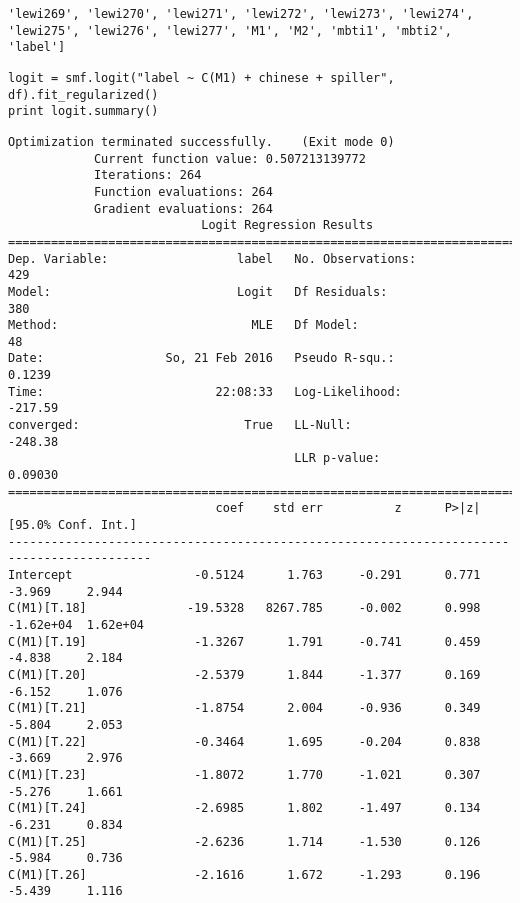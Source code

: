\documentclass[12pt,fleqn]{article}\usepackage{../common}
\begin{document}
\begin{verbatim}
'lewi269', 'lewi270', 'lewi271', 'lewi272', 'lewi273', 'lewi274', 'lewi275', 'lewi276', 'lewi277', 'M1', 'M2', 'mbti1', 'mbti2', 'label']
\end{verbatim}

\begin{verbatim}
logit = smf.logit("label ~ C(M1) + chinese + spiller", df).fit_regularized()
print logit.summary()
\end{verbatim}

\begin{verbatim}
Optimization terminated successfully.    (Exit mode 0)
            Current function value: 0.507213139772
            Iterations: 264
            Function evaluations: 264
            Gradient evaluations: 264
                           Logit Regression Results                           
==============================================================================
Dep. Variable:                  label   No. Observations:                  429
Model:                          Logit   Df Residuals:                      380
Method:                           MLE   Df Model:                           48
Date:                 So, 21 Feb 2016   Pseudo R-squ.:                  0.1239
Time:                        22:08:33   Log-Likelihood:                -217.59
converged:                       True   LL-Null:                       -248.38
                                        LLR p-value:                   0.09030
==========================================================================================
                             coef    std err          z      P>|z|      [95.0% Conf. Int.]
------------------------------------------------------------------------------------------
Intercept                 -0.5124      1.763     -0.291      0.771        -3.969     2.944
C(M1)[T.18]              -19.5328   8267.785     -0.002      0.998     -1.62e+04  1.62e+04
C(M1)[T.19]               -1.3267      1.791     -0.741      0.459        -4.838     2.184
C(M1)[T.20]               -2.5379      1.844     -1.377      0.169        -6.152     1.076
C(M1)[T.21]               -1.8754      2.004     -0.936      0.349        -5.804     2.053
C(M1)[T.22]               -0.3464      1.695     -0.204      0.838        -3.669     2.976
C(M1)[T.23]               -1.8072      1.770     -1.021      0.307        -5.276     1.661
C(M1)[T.24]               -2.6985      1.802     -1.497      0.134        -6.231     0.834
C(M1)[T.25]               -2.6236      1.714     -1.530      0.126        -5.984     0.736
C(M1)[T.26]               -2.1616      1.672     -1.293      0.196        -5.439     1.116

\end{verbatim}
\end{document}
